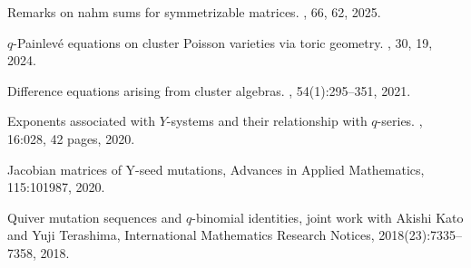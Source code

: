 \documentclass[10pt,a4paper,sans]{moderncv}        %
\begin{document}
\renewcommand{\refname}{Publications}
\begin{thebibliography}{1}

  Remarks on nahm sums for symmetrizable matrices.
 , 66, 62, 2025.
  
  {$q$}-{P}ainlev\'{e} equations on cluster {P}oisson varieties via toric geometry.
, 30, 19, 2024.

Difference equations arising from cluster algebras.
, 54(1):295--351, 2021.


Exponents associated with {$Y$}-systems and their relationship with
  {$q$}-series.
, 16:028, 42
  pages, 2020.

Jacobian matrices of Y-seed mutations,
\newblock Advances in Applied Mathematics, 115:101987, 2020.

Quiver mutation sequences and $q$-binomial identities,
\newblock joint work with Akishi Kato and Yuji Terashima,
\newblock International Mathematics Research Notices,
  2018(23):7335--7358, 2018.
  
\end{thebibliography}
\end{document}
